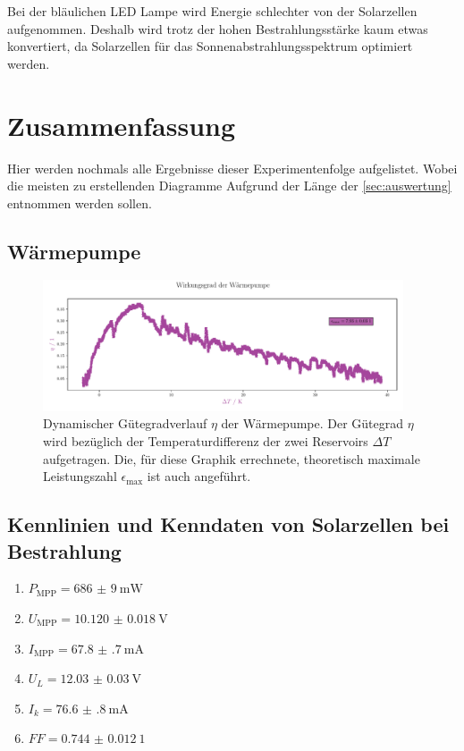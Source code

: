 \documentclass[12pt,english,ngerman]{scrartcl}
\begin{document}
Bei der bläulichen LED Lampe wird Energie schlechter von der Solarzellen
aufgenommen. Deshalb wird trotz der hohen Bestrahlungsstärke kaum etwas
konvertiert, da Solarzellen für das Sonnenabstrahlungsspektrum optimiert
werden.

\section{Zusammenfassung}\label{sec:zusammenfassung}

Hier werden nochmals alle Ergebnisse dieser Experimentenfolge aufgelistet.
Wobei die meisten zu erstellenden Diagramme Aufgrund der Länge der
\autoref{sec:auswertung} entnommen werden sollen.

\subsection{Wärmepumpe}
\begin{figure}[H]
	\centering
	\includegraphics[width=0.95\textwidth]{figures/wirkungsgradVerlauf.pdf}
	\caption[Dynamischer Gütegradverlauf $\eta$ der Wärmepumpe]{Dynamischer Gütegradverlauf
		$\eta$ der Wärmepumpe. Der Gütegrad $\eta$ wird bezüglich der
		Temperaturdifferenz der zwei Reservoirs $\Delta T$ aufgetragen. Die, für diese
		Graphik errechnete, theoretisch maximale Leistungszahl $\epsilon_\text{max}$
		ist auch angeführt.
	}\label{fig:zusammenfassung}
\end{figure}

\subsection{Kennlinien und Kenndaten von Solarzellen bei Bestrahlung}

\begin{enumerate}
	\item $P_\text{MPP} = \SI{686(9)}{\milli\watt}$
	\item $U_\text{MPP} = \SI{10.120(18)}{\volt}$
	\item $I_\text{MPP} = \SI{67.8(7)}{\milli\ampere}$
	\item $U_L = \SI{12.03(3)}{\volt}$
	\item $I_k = \SI{76.6(8)}{\milli\ampere}$
	\item $FF = \SI{0.744(12)}{1}$
\end{enumerate}
\end{document}
